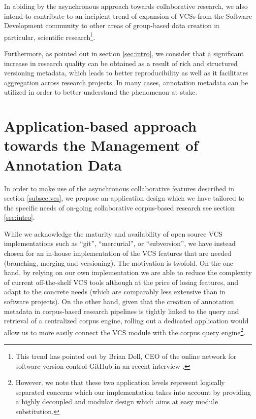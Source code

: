 \documentclass{sig-alternate}
\begin{document}
In abiding by the asynchronous approach towards collaborative research, we also intend to
contribute to an incipient trend of expansion of VCSs from the Software Development community
to other areas of group-based data creation \textemdash in particular, scientific research\footnote{
  This trend has pointed out by Brian Doll, CEO of the online network for software version
  control GitHub in an recent interview \cite{Begel2013}.
}.

Furthermore, as pointed out in section \ref{sec:intro}, we consider that a significant increase in
research quality can be obtained as a result of rich and structured versioning metadata,
which leads to better reproducibility as well as it facilitates aggregation across research
projects. In many cases, annotation metadata can be utilized in order to better understand the
phenomenon at stake.

\section{Application-based approach towards the Management of Annotation Data}\label{sec:case}

In order to make use of the asynchronous collaborative features described in section
\ref{subsec:vcs}, we propose an application design which we have tailored to the specific needs
of on-going collaborative corpus-based research \textemdash see section \ref{sec:intro}.

While we acknowledge the maturity and availability of open source VCS implementations such as
``git'', ``mercurial'', or ``subversion'', we have instead chosen for an in-house implementation
of the VCS features that are needed (branching, merging and versioning). The motivation is twofold.
On the one hand, by relying on our own implementation we are able to reduce the complexity of
current off-the-shelf VCS tools \textemdash although at the price of losing features,
and adapt to the concrete needs (which are comparably less extensive than in software projects).
On the other hand, given that the creation of annotation metadata in corpus-based research
pipelines is tightly linked to the query and retrieval of a centralized corpus engine, rolling out
a dedicated application would allow us to more easily connect the VCS module with the corpus
query engine\footnote{
  However, we note that these two application levels represent logically separated
  concerns \textemdash which our implementation takes into account by providing a highly decoupled
  and modular design which aims at easy module substitution.
}.
\end{document}
